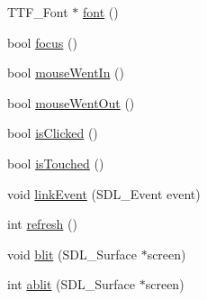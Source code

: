 \begin{DoxyCompactItemize}
T\+T\+F\+\_\+\+Font $\ast$ \hyperlink{classsanform_aa33726f8c6ff89ec440b177dcee89dce}{font} ()
\item 
bool \hyperlink{classsanform_a10b8fbcc060003ce398421176502c375}{focus} ()
\item 
bool \hyperlink{classsanform_ab6f0ce5b004f20eb7ebd0c361dd8a222}{mouse\+Went\+In} ()
\item 
bool \hyperlink{classsanform_a1cceeae35994686a61f81578d528892c}{mouse\+Went\+Out} ()
\item 
bool \hyperlink{classsanform_ade8b8153fadcabca1663bc6599a6a9c9}{is\+Clicked} ()
\item 
bool \hyperlink{classsanform_a722086e507662de062fe00328be6e28b}{is\+Touched} ()
\item 
void \hyperlink{classsanform_a0729c43132fe4d6e81d84101cdeb73c5}{link\+Event} (S\+D\+L\+\_\+\+Event event)
\item 
int \hyperlink{classsanform_af9d12ff50cbc86a458e0d5f6224b2b2b}{refresh} ()
\item 
void \hyperlink{classsanform_ab2684dad6e42929090b11beceba55b38}{blit} (S\+D\+L\+\_\+\+Surface $\ast$screen)
\item 
int \hyperlink{classsanform_a4ba8f41e8a5b045dc3fb456e45c5e146}{ablit} (S\+D\+L\+\_\+\+Surface $\ast$screen)
\end{DoxyCompactItemize}
